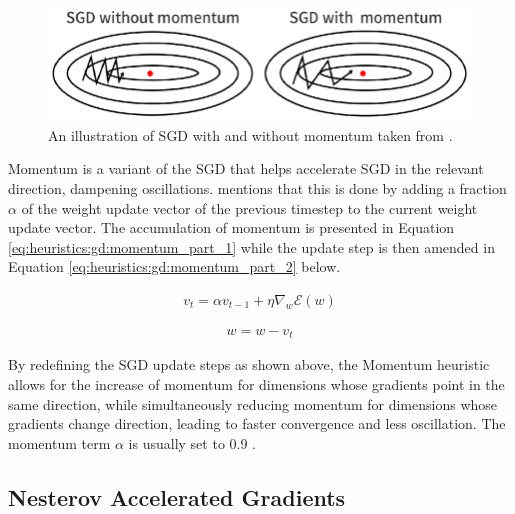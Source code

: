\begin{figure}[htbp]
    \includegraphics[width=\textwidth]{images/sgd_with_and_without_momentum.png}
    \caption{An illustration of \ac{SGD} with and without momentum taken from \cite{ref:du:2019}.}
    \label{fig:heuristics:gd:sgd_with_and_without_momentum}
\end{figure}

Momentum \cite{ref:qian:1999} is a variant of the \ac{SGD} that helps accelerate \ac{SGD} in the relevant direction, dampening oscillations. \cite{ref:ruder:2016} mentions that this is done by adding a fraction $\alpha$ of the weight update vector of the previous timestep to the current weight update vector. The accumulation of momentum is presented in Equation \ref{eq:heuristics:gd:momentum_part_1} while the update step is then amended in Equation \ref{eq:heuristics:gd:momentum_part_2} below.

\begin{equation}
    \label{eq:heuristics:gd:momentum_part_1}
    \begin{split}
        v_{t} = \alpha v_{t-1} + \eta \nabla_{w}\mathcal{E}(w)
    \end{split}
\end{equation}

\begin{equation}
    \label{eq:heuristics:gd:momentum_part_2}
    \begin{split}
        w = w - v_{t}
    \end{split}
\end{equation}

By redefining the \ac{SGD} update steps as shown above, the \ac{Momentum} heuristic allows for the increase of momentum for dimensions whose gradients point in the same direction, while simultaneously reducing momentum for dimensions whose gradients change direction, leading to faster convergence and less oscillation. The momentum term $\alpha$ is usually set to 0.9 \cite{ref:engelbrecht:2007}\cite{ref:ruder:2016}. 


\subsection{Nesterov Accelerated Gradients}
\label{sec:heuristics:nag}

